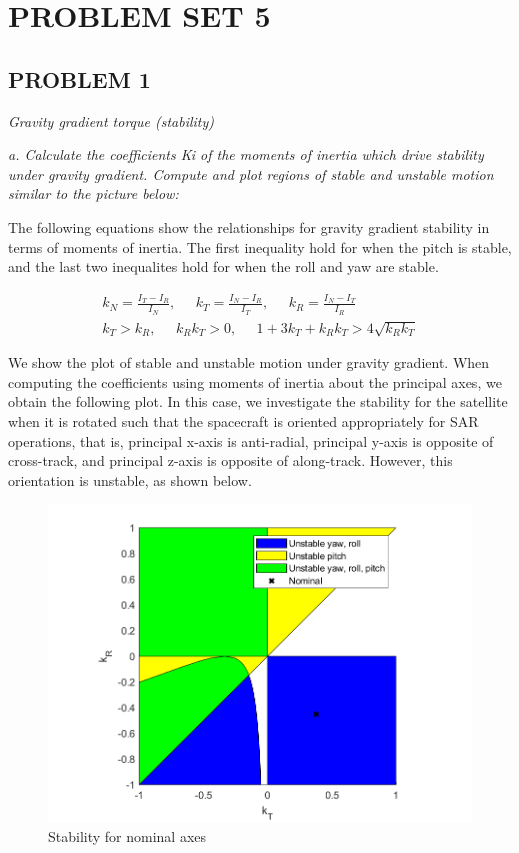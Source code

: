 \section{\Large PROBLEM SET 5}
\subsection{PROBLEM 1}
\textit{Gravity gradient torque (stability)}

\textit{a. Calculate the coefficients Ki of the moments of inertia which drive stability under gravity gradient. Compute and plot regions of stable and unstable motion similar to the picture below:}

The following equations show the relationships for gravity gradient stability in terms of moments of inertia. The first inequality hold for when the pitch is stable, and the last two inequalites hold for when the roll and yaw are stable.

\begin{align*}
    k_N = \frac{I_T - I_R}{I_N}, \;\;\;\;\;
    k_T = \frac{I_N - I_R}{I_T}, \;\;\;\;\;
    k_R = \frac{I_N - I_T}{I_R} \\
    k_T > k_R, \;\;\;\;\;
    k_R k_T > 0, \;\;\;\;\;
    1 + 3 k_T + k_R k_T > 4 \sqrt{k_R k_T}
\end{align*}

We show the plot of stable and unstable motion under gravity gradient. When computing the coefficients using moments of inertia about the principal axes, we obtain the following plot. In this case, we investigate the stability for the satellite when it is rotated such that the spacecraft is oriented appropriately for SAR operations, that is, principal x-axis is anti-radial, principal y-axis is opposite of cross-track, and principal z-axis is opposite of along-track. However, this orientation is unstable, as shown below.

\begin{figure}[H]
\centering
\includegraphics[scale=0.6]{Images/ps5_problem1a.png}
\caption{Stability for nominal axes}
\label{fig:ps5_problem1a}
\end{figure}


